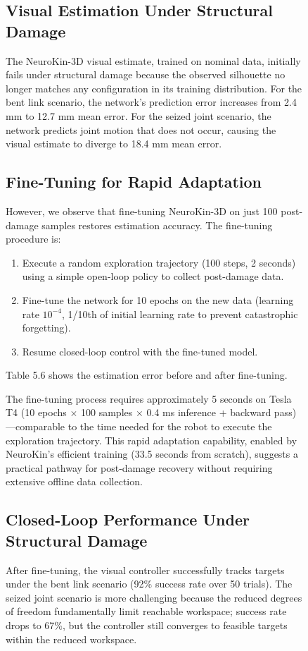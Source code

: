 \documentclass[12pt,a4paper,oneside]{report}
\begin{document}
\begin{figure}[H]
\subsection{Visual Estimation Under Structural Damage}

The NeuroKin-3D visual estimate, trained on nominal data, initially fails under structural damage because the observed silhouette no longer matches any configuration in its training distribution. For the bent link scenario, the network's prediction error increases from 2.4 mm to 12.7 mm mean error. For the seized joint scenario, the network predicts joint motion that does not occur, causing the visual estimate to diverge to 18.4 mm mean error.

\subsection{Fine-Tuning for Rapid Adaptation}

However, we observe that fine-tuning NeuroKin-3D on just 100 post-damage samples restores estimation accuracy. The fine-tuning procedure is:
\begin{enumerate}
    \item Execute a random exploration trajectory (100 steps, 2 seconds) using a simple open-loop policy to collect post-damage data.
    \item Fine-tune the network for 10 epochs on the new data (learning rate $10^{-4}$, 1/10th of initial learning rate to prevent catastrophic forgetting).
    \item Resume closed-loop control with the fine-tuned model.
\end{enumerate}
Table 5.6 shows the estimation error before and after fine-tuning.

The fine-tuning process requires approximately 5 seconds on Tesla T4 (10 epochs $\times$ 100 samples $\times$ 0.4 ms inference + backward pass)---comparable to the time needed for the robot to execute the exploration trajectory. This rapid adaptation capability, enabled by NeuroKin's efficient training (33.5 seconds from scratch), suggests a practical pathway for post-damage recovery without requiring extensive offline data collection.

\subsection{Closed-Loop Performance Under Structural Damage}

After fine-tuning, the visual controller successfully tracks targets under the bent link scenario (92\% success rate over 50 trials). The seized joint scenario is more challenging because the reduced degrees of freedom fundamentally limit reachable workspace; success rate drops to 67\%, but the controller still converges to feasible targets within the reduced workspace.


\end{figure}
\end{document}
